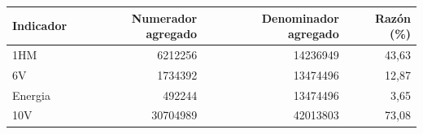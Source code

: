 \begin{tabular}{@{}lrrr@{}}
\toprule
Indicador & Numerador agregado & Denominador agregado & Razón (\%) \\
\midrule
1HM & 6212256 & 14236949 & 43,63 \\
6V & 1734392 & 13474496 & 12,87 \\
Energia & 492244 & 13474496 & 3,65 \\
10V & 30704989 & 42013803 & 73,08 \\
\bottomrule
\end{tabular}
